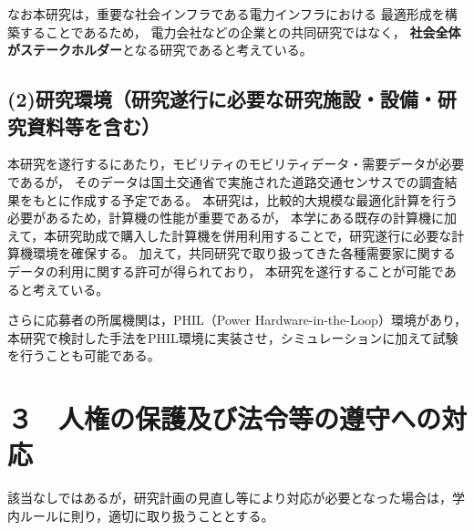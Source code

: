 \documentclass[11pt,a4paper,uplatex,dvipdfmx]{ujarticle} 		%
\newcommand{\研究課題名}{モビリティの時空間調整を活用した電力設備形成構築}
\newcommand{\研究機関名}{名古屋工業大学}
\newcommand{\研究代表者氏名}{中村勇太}
\newcommand{\研究期間の最終元号年度}{10}  %
\begin{document}
	なお本研究は，重要な社会インフラである電力インフラにおける%
	最適形成を構築することであるため，
	電力会社などの企業との共同研究ではなく，
	\textbf{社会全体がステークホルダー}となる研究であると考えている。

		
\vspace{-1\baselineskip}           %
\subsection*{(2)研究環境（研究遂行に必要な研究施設・設備・研究資料等を含む）}
\vspace{-0.5\baselineskip}           %

	本研究を遂行するにあたり，モビリティのモビリティデータ・需要データが必要であるが，
	そのデータは国土交通省で実施された道路交通センサスでの調査結果をもとに作成する予定である。
	本研究は，比較的大規模な最適化計算を行う必要があるため，計算機の性能が重要であるが，
	本学にある既存の計算機に加えて，本研究助成で購入した計算機を併用利用することで，研究遂行に必要な計算機環境を確保する。	
	加えて，共同研究で取り扱ってきた各種需要家に関するデータの利用に関する許可が得られており，
	本研究を遂行することが可能であると考えている。

	さらに応募者の所属機関は，PHIL（Power Hardware-in-the-Loop）環境があり，
	本研究で検討した手法をPHIL環境に実装させ，シミュレーションに加えて試験を行うことも可能である。
	




\section{３　人権の保護及び法令等の遵守への対応}

該当なしではあるが，研究計画の見直し等により対応が必要となった場合は，学内ルールに則り，適切に取り扱うこととする。

\end{document}
